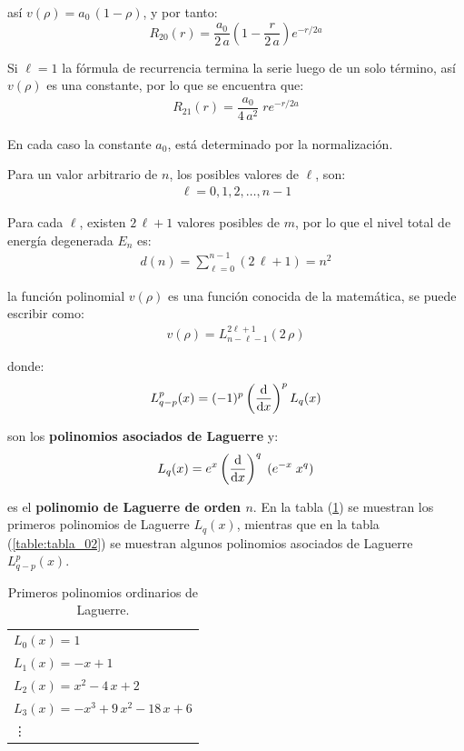así $v(\rho) = a_{0} \, (1 - \rho)$, y por tanto:
\begin{equation}
R_{20}(r) = \dfrac{a_{0}}{2 \, a} \left(1 - \dfrac{r}{2 \, a} \right) e^{-r/2a}
\label{eq:ecuacion_04_82}
\end{equation}

Si $\ell = 1$ la fórmula de recurrencia termina la serie luego de un solo término, así $v(\rho)$ es una constante, por lo que se encuentra que:
\begin{align}
R_{21}(r) = \dfrac{a_{0}}{4 \, a^{2}} \; r e^{-r/2a}
\label{eq:ecuacion_04_83}
\end{align}

En cada caso la constante $a_{0}$, está determinado por la normalización.
\par
Para un valor arbitrario de $n$, los posibles valores de $\ell$, son:
\begin{align}
\ell = 0, 1, 2, \ldots, n - 1
\label{eq:ecuacion_04_84}
\end{align}

Para cada $\ell$, existen $2 \, \ell + 1$ valores posibles de $m$, por lo que el nivel total de energía degenerada $E_{n}$ es:
\begin{align}
d(n) = \sum_{\ell = 0}^{n - 1} (2 \, \ell + 1) = n^{2}
\label{eq:ecuacion_04_85}
\end{align}

la función polinomial $v(\rho)$ es una función conocida de la matemática, se puede escribir como:
\begin{align}
v(\rho) = L_{n-\ell-1}^{2\ell+1}(2 \, \rho)
\label{eq:ecuacion_04_86}
\end{align}

donde:
\begin{align}
L_{q-p}^{p} (x) = (-1)^{p} \left( \dv{x} \right)^{p} L_{q}(x)
\label{eq:ecuacion_04_87}
\end{align}

son los \textbf{polinomios asociados de Laguerre} y:
\begin{align}
L_{q}(x) = e^{x} \left( \dv{x} \right)^{q} \; (e^{-x} \; x^{q})
\label{eq:ecuacion_04_88}
\end{align}

es el \textbf{polinomio de Laguerre de orden $n$}. En la tabla (\ref{table:tabla_01}) se muestran los primeros polinomios de Laguerre $L_{q}(x)$, mientras que en la tabla (\ref{table:tabla_02}) se muestran algunos polinomios asociados de Laguerre $L_{q-p}^{p}(x)$.
\begin{table}[H]
\centering
\large
\begin{tabular}{l}
$L_{0} (x) = 1$ \\
$L_{1} (x) = - x + 1$ \\
$L_{2} (x) = x^{2} - 4 \, x + 2$ \\
$L_{3} (x) = - x^{3} + 9 \, x^{2} - 18 \, x + 6$ \\
\vdots 
\end{tabular}
\caption{Primeros polinomios ordinarios de Laguerre.}
\label{table:tabla_01}
\end{table}

